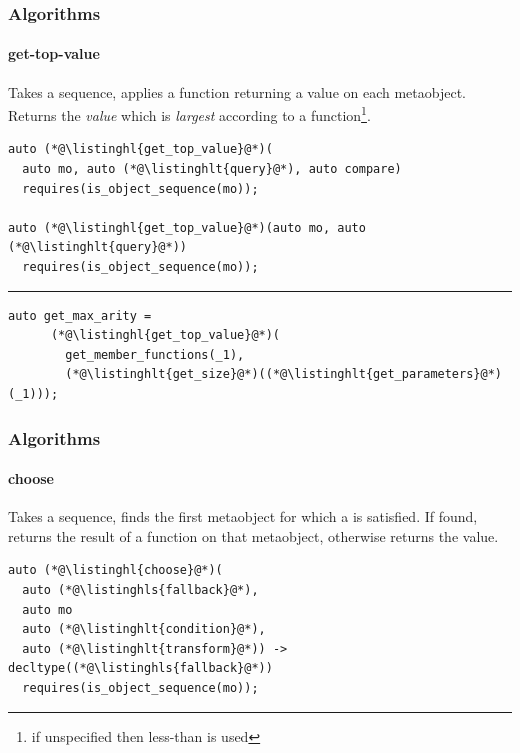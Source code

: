\documentclass[aspectratio=169,compress,table,xcolor=table]{beamer}
\begin{document}
\begin{frame}[fragile]
  \frametitle{Algorithms}
  \framesubtitle{get-top-value}
  Takes a sequence, applies a  function returning a value on each metaobject.\\
  Returns the {\em value} which is {\em largest} according
  to a  function\footnote{if unspecified then less-than is used}.
  \begin{lstlisting}[language=c++2x]
auto (*@\listinghl{get_top_value}@*)(
  auto mo, auto (*@\listinghlt{query}@*), auto compare)
  requires(is_object_sequence(mo));

auto (*@\listinghl{get_top_value}@*)(auto mo, auto (*@\listinghlt{query}@*))
  requires(is_object_sequence(mo));
  \end{lstlisting}
  \hrule
  \vfill
  \begin{lstlisting}[language=c++2x,basicstyle=\small\ttfamily]
    auto get_max_arity =
      (*@\listinghl{get_top_value}@*)(
        get_member_functions(_1),
        (*@\listinghlt{get_size}@*)((*@\listinghlt{get_parameters}@*)(_1)));
  \end{lstlisting}
\end{frame}
\begin{frame}[fragile]
  \frametitle{Algorithms}
  \framesubtitle{choose}
  Takes a sequence, finds the first metaobject for which a 
  is satisfied. If found, returns the result of a  function
  on that metaobject, otherwise returns the  value.
  \begin{lstlisting}[language=c++2x]
auto (*@\listinghl{choose}@*)(
  auto (*@\listinghls{fallback}@*),
  auto mo
  auto (*@\listinghlt{condition}@*),
  auto (*@\listinghlt{transform}@*)) -> decltype((*@\listinghls{fallback}@*))
  requires(is_object_sequence(mo));

  \end{lstlisting}
\end{frame}
\end{document}
